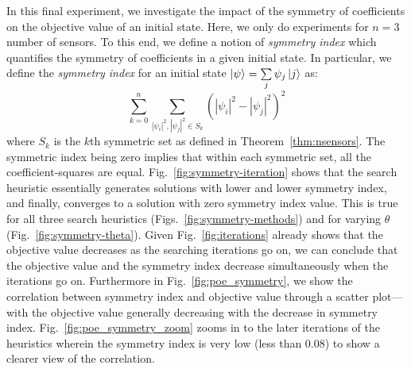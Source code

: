In this final experiment, we investigate the impact of the symmetry of coefficients on the objective value of an initial state. 
Here, we only do experiments for $n=3$ number of sensors.
To this end, we define a notion of {\em symmetry index} which quantifies the symmetry of coefficients in a given initial
state. In particular, we define the {\em symmetry index} for an initial state
$\ket{\psi} = \sum\limits_j \psi_j \ket{j}$ as:  
\begin{equation}
\sum_{k=0}^{n} \sum_{|\psi_i|^2, |\psi_j|^2 \in S_k} (|\psi_i|^2 - |\psi_j|^2)^2
\label{eqn:symmety} 
\end{equation}
\noindent
where $S_k$ is the $k$th symmetric set as defined in Theorem~\ref{thm:nsensors}.
The symmetric index being zero implies that within each symmetric set, all the coefficient-squares are equal.
Fig.~\ref{fig:symmetry-iteration} shows that the search heuristic essentially generates solutions with lower and lower symmetry index, and finally, converges to a solution with zero symmetry index value. 
This is true for all three search heuristics (Figs.~\ref{fig:symmetry-methods}) and for varying $\theta$ (Fig.~\ref{fig:symmetry-theta}).
Given Fig.~\ref{fig:iterations} already shows that the objective value decreases as the searching iterations go on, we can conclude that the objective value and the symmetry index decrease simultaneously when the iterations go on.
Furthermore in Fig.~\ref{fig:poe_symmetry}, we show the correlation between symmetry index and objective value through a scatter plot---with the objective value generally decreasing with the decrease in symmetry index. 
Fig.~\ref{fig:poe_symmetry_zoom} zooms in to the later iterations of the heuristics wherein the symmetry index is very low (less than 0.08) to show a clearer view of the correlation.





